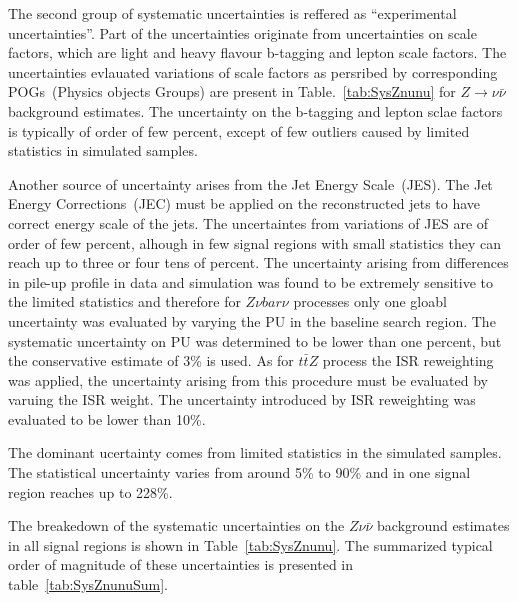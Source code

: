 The second group of systematic uncertainties is reffered as ``experimental uncertainties''. Part of the uncertainties originate from uncertainties on scale factors, which are light and heavy flavour b-tagging and lepton scale factors. The uncertainties evlauated variations of scale factors as persribed by corresponding POGs~(Physics objects Groups) are present in Table.~\ref{tab:SysZnunu} for $Z \to \nu \bar{\nu}$ background estimates. The uncertainty on the b-tagging and lepton sclae factors is typically of order of few percent, except of few outliers caused by limited statistics in simulated samples.

Another source of uncertainty arises from the Jet Energy Scale~(JES). The Jet Energy Corrections~(JEC) must be applied on the reconstructed jets to have correct energy scale of the jets. The uncertaintes from variations of JES are of order of few percent, alhough in few signal regions with small statistics they can reach up to three or four tens of percent. The uncertainty arising from differences in pile-up profile in data and simulation was found to be extremely sensitive to the limited statistics and therefore for $Z \nu bar{\nu}$ processes only one gloabl uncertainty was evaluated by varying the PU in the baseline search region. The systematic uncertainty on PU was determined to be lower than one percent, but the conservative estimate of 3\% is used. As for $t\bar{t}Z$ process the ISR reweighting was applied, the uncertainty arising from this procedure must be evaluated by varuing the ISR weight. The uncertainty introduced by ISR reweighting was evaluated to be lower than 10\%.

The dominant ucertainty comes from limited statistics in the simulated samples. The statistical uncertainty varies from around 5\% to 90\% and in one signal region reaches up to 228\%.

The breakedown of the systematic uncertainties on the $Z \nu \bar{\nu}$  background estimates in all signal regions is shown in Table~\ref{tab:SysZnunu}. The summarized typical order of magnitude of these uncertainties is presented in table~\ref{tab:SysZnunuSum}.


